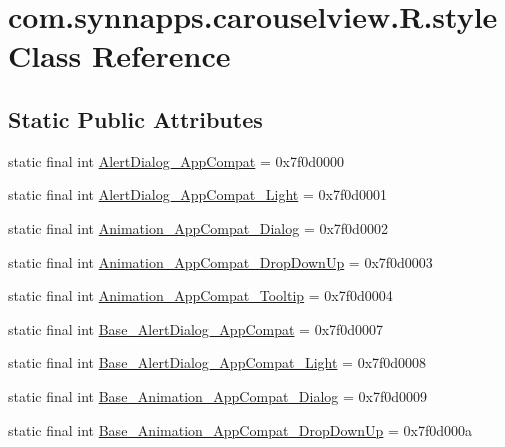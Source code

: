 \hypertarget{classcom_1_1synnapps_1_1carouselview_1_1_r_1_1style}{}\section{com.\+synnapps.\+carouselview.\+R.\+style Class Reference}
\label{classcom_1_1synnapps_1_1carouselview_1_1_r_1_1style}
\subsection*{Static Public Attributes}
\begin{DoxyCompactItemize}
\item 
static final int \mbox{\hyperlink{classcom_1_1synnapps_1_1carouselview_1_1_r_1_1style_a1944d7b5dad87f20fd0de7f390a56a42}{Alert\+Dialog\+\_\+\+App\+Compat}} = 0x7f0d0000
\item 
static final int \mbox{\hyperlink{classcom_1_1synnapps_1_1carouselview_1_1_r_1_1style_a4a1468fdd4b770023b9599917410cfc5}{Alert\+Dialog\+\_\+\+App\+Compat\+\_\+\+Light}} = 0x7f0d0001
\item 
static final int \mbox{\hyperlink{classcom_1_1synnapps_1_1carouselview_1_1_r_1_1style_a1d039cf3e94a171715bf0286f70d9873}{Animation\+\_\+\+App\+Compat\+\_\+\+Dialog}} = 0x7f0d0002
\item 
static final int \mbox{\hyperlink{classcom_1_1synnapps_1_1carouselview_1_1_r_1_1style_af76372170094a2fcf41886508f649d05}{Animation\+\_\+\+App\+Compat\+\_\+\+Drop\+Down\+Up}} = 0x7f0d0003
\item 
static final int \mbox{\hyperlink{classcom_1_1synnapps_1_1carouselview_1_1_r_1_1style_a00c06146c6c62af06892d71f29e37bb5}{Animation\+\_\+\+App\+Compat\+\_\+\+Tooltip}} = 0x7f0d0004
\item 
static final int \mbox{\hyperlink{classcom_1_1synnapps_1_1carouselview_1_1_r_1_1style_aca4a59753e44cfc67bddada1a8bbab94}{Base\+\_\+\+Alert\+Dialog\+\_\+\+App\+Compat}} = 0x7f0d0007
\item 
static final int \mbox{\hyperlink{classcom_1_1synnapps_1_1carouselview_1_1_r_1_1style_a0d755deff96b365bce789fe932c40773}{Base\+\_\+\+Alert\+Dialog\+\_\+\+App\+Compat\+\_\+\+Light}} = 0x7f0d0008
\item 
static final int \mbox{\hyperlink{classcom_1_1synnapps_1_1carouselview_1_1_r_1_1style_a1f46901210a35d59f3950d84748f4140}{Base\+\_\+\+Animation\+\_\+\+App\+Compat\+\_\+\+Dialog}} = 0x7f0d0009
\item 
static final int \mbox{\hyperlink{classcom_1_1synnapps_1_1carouselview_1_1_r_1_1style_a214449129c12fe6ac05b39e50c418f33}{Base\+\_\+\+Animation\+\_\+\+App\+Compat\+\_\+\+Drop\+Down\+Up}} = 0x7f0d000a

\end{DoxyCompactItemize}
